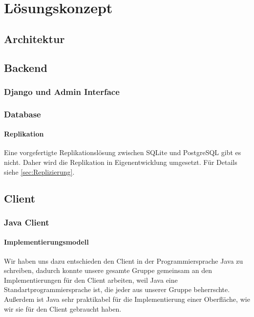 \documentclass[12pt,a4paper,ngerman,english]{report}
\begin{document}
\chapter{Lösungskonzept}
\section{Architektur}
\section{Backend}
\subsection{Django und Admin Interface}
\subsection{Database}

\subsubsection{Replikation}

Eine vorgefertigte Replikationslösung zwischen SQLite und PostgreSQL gibt es nicht. Daher wird die Replikation in Eigenentwicklung umgesetzt. Für Details siehe \autoref{sec:Replizierung}.

\section{Client}
\subsection{Java Client}
\subsubsection{Implementierungsmodell}
Wir haben uns dazu entschieden den Client in der Programmiersprache Java zu schreiben, dadurch konnte unsere gesamte Gruppe gemeinsam an den Implementierungen für den Client arbeiten, weil Java eine Standartprogrammiersprache ist, die jeder aus unserer Gruppe beherrschte. Außerdem ist Java sehr praktikabel für die Implementierung einer Oberfläche, wie wir sie für den Client gebraucht haben.\\
\end{document}
